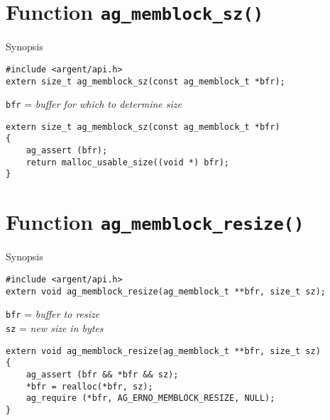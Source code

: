 %


\section{Function \texttt{ag\_memblock\_sz()}}
  \begin{bclogo}[logo=\bccrayon, noborder=true, barre=snake, couleurBarre=gray]
    {Synopsis}
  \lstset{style=SYNOPSIS}
  \begin{lstlisting}[linewidth=1.0\linewidth]
#include <argent/api.h>
extern size_t ag_memblock_sz(const ag_memblock_t *bfr);
  \end{lstlisting}
  \scriptsize
  \texttt{bfr} = \emph{buffer for which to determine size}
  \end{bclogo}

\lstset{style=CODE}
\begin{lstlisting}[linewidth=1.0\linewidth,
    caption=Definition of ag\_memblock\_sz()]
extern size_t ag_memblock_sz(const ag_memblock_t *bfr)
{
    ag_assert (bfr);
    return malloc_usable_size((void *) bfr);
}
\end{lstlisting}


%


\section{Function \texttt{ag\_memblock\_resize()}}
  \begin{bclogo}[logo=\bccrayon, noborder=true, barre=snake, couleurBarre=gray]
    {Synopsis}
  \lstset{style=SYNOPSIS}
  \begin{lstlisting}[linewidth=1.0\linewidth]
#include <argent/api.h>
extern void ag_memblock_resize(ag_memblock_t **bfr, size_t sz);
  \end{lstlisting}
  \scriptsize
  \texttt{bfr} = \emph{buffer to resize} \\
  \texttt{sz} = \emph{new size in bytes}
  \end{bclogo}

\lstset{style=CODE}
\begin{lstlisting}[linewidth=1.0\linewidth,
    caption=Definition of ag\_memblock\_resize()]
extern void ag_memblock_resize(ag_memblock_t **bfr, size_t sz)
{
    ag_assert (bfr && *bfr && sz);
    *bfr = realloc(*bfr, sz);
    ag_require (*bfr, AG_ERNO_MEMBLOCK_RESIZE, NULL);
}
\end{lstlisting}


